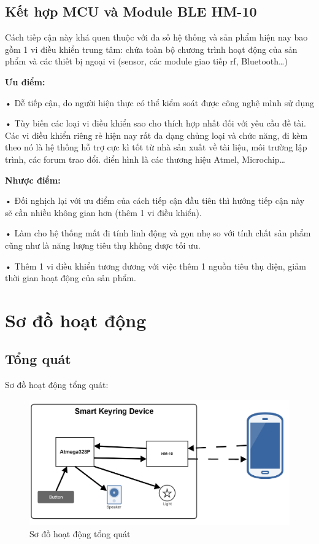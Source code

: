 \subsection{Kết hợp MCU và Module BLE HM-10}
Cách tiếp cận này khá quen thuộc với đa số hệ thống và sản phẩm hiện nay bao gồm 1 vi điều khiển trung tâm: chứa toàn bộ chương trình hoạt động của sản phẩm và các thiết bị ngoại vi (sensor, các module giao tiếp rf, Bluetooth…)

\textbf{Ưu điểm: }

• Dễ tiếp cận, do người hiện thực có thể kiểm soát được công nghệ mình sử dụng

• Tùy biến các loại vi điều khiển sao cho thích hợp nhất đối với yêu cầu đề tài. Các vi điều khiển riêng rẻ hiện nay rất đa dạng chủng loại và chức năng, đi kèm theo nó là hệ thống hỗ trợ cực kì tốt từ nhà sản xuất về tài liệu, môi trường lập trình, các forum trao đổi. điển hình là các thương hiệu Atmel, Microchip…

\textbf{Nhược điểm:} 

• Đối nghịch lại với ưu điểm của cách tiếp cận đầu tiên thì hướng tiếp cận này sẽ cần nhiều không gian hơn (thêm 1 vi điều khiển).

• Làm cho hệ thống mất đi tính linh động và gọn nhẹ so với tính chất sản phẩm cũng như là năng lượng tiêu thụ không được tối ưu.

• Thêm 1 vi điều khiển tương đương với việc thêm 1 nguồn tiêu thụ điện, giảm thời gian hoạt động của sản phẩm.

\section{Sơ đồ hoạt động}
\subsection{Tổng quát}
Sơ đồ hoạt động tổng quát:

\begin{figure}[h]
	\centering    
	\includegraphics[width=1.0\textwidth]{general}
	\caption[Sơ đồ hoạt động tổng quát]{Sơ đồ hoạt động tổng quát}
	\label{fig: general}
\end{figure}

